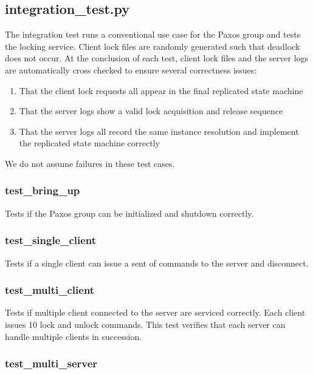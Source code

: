 \documentclass{article}
\begin{document}
\subsection{integration\_test.py}

The integration test runs a conventional use case for the Paxos group and tests the locking service.
Client lock files are randomly generated such that deadlock does not occur.
At the conclusion of each test, client lock files and the server logs are automatically cross checked to ensure several correctness issues:
\begin{enumerate}
\item That the client lock requests all appear in the final replicated state machine
\item That the server logs show a valid lock acquisition and release sequence
\item That the server logs all record the same instance resolution and implement the replicated state machine correctly
\end{enumerate}

We do not assume failures in these test cases.

\subsubsection{test\_bring\_up}

Tests if the Paxos group can be initialized and shutdown correctly.

\subsubsection{test\_single\_client}

Tests if a single client can issue a sent of commands to the server and disconnect.

\subsubsection{test\_multi\_client}

Tests if multiple client connected to the server are serviced correctly.
Each client issues 10 lock and unlock commands.
This test verifies that each server can handle multiple clients in succession.

\subsubsection{test\_multi\_server}
\end{document}
